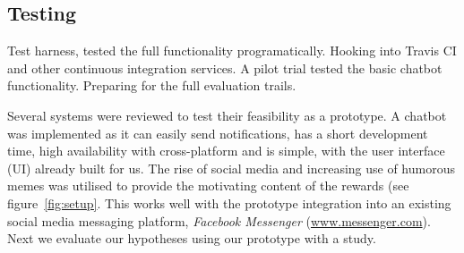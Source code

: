 \subsection{Testing}

Test harness, tested the full functionality programatically. Hooking into Travis CI and other continuous integration services.
A pilot trial tested the basic chatbot functionality. Preparing for the full evaluation trails.


Several systems were reviewed to test their feasibility as a prototype. A chatbot was implemented as it can easily send notifications, has a short development time, high availability with cross-platform and is simple, with the user interface (UI) already built for us. The rise of social media and increasing use of humorous memes was utilised to provide the motivating content of the rewards (see figure~\ref{fig:setup}. This works well with the prototype integration into an existing social media messaging platform, \textit{Facebook Messenger} (\url{www.messenger.com}). Next we evaluate our hypotheses using our prototype with a study.
\newpage